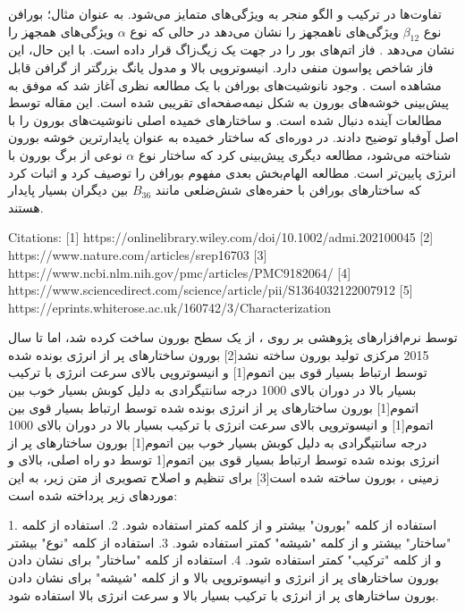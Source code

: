 
تفاوت‌ها در ترکیب و الگو منجر به ویژگی‌های متمایز می‌شود. به عنوان مثال؛ بورافن نوع $\beta_{12}$ ویژگی‌های ناهمجهز را نشان می‌دهد  در حالی که نوع $\alpha$ ویژگی‌های همجهز را نشان می‌دهد . فاز  اتم‌های بور را در جهت یک زیگ‌زاگ قرار داده است. با این حال، این فاز شاخص پواسون منفی دارد. انیسوتروپی بالا و مدول یانگ بزرگتر از گرافن قابل مشاهده است . وجود نانوشیت‌های بورافن با یک مطالعه نظری آغاز شد  که موفق به پیش‌بینی خوشه‌های بورون به شکل نیمه‌صفحه‌ای تقریبی شده است. این مقاله توسط مطالعات آینده دنبال شده است.  و  ساختارهای خمیده اصلی نانوشیت‌های بورون  را با اصل آوفباو توضیح دادند. در دوره‌ای که ساختار خمیده به عنوان پایدارترین خوشه بورون شناخته می‌شود، مطالعه دیگری  پیش‌بینی کرد که ساختار نوع $\alpha$ نوعی از برگ بورون با انرژی پایین‌تر است. مطالعه الهام‌بخش بعدی  مفهوم بورافن را توصیف کرد و اثبات کرد که ساختارهای بورافن با حفره‌های شش‌ضلعی مانند $B_{36}$ بین دیگران بسیار پایدار هستند.
\begin{latin}
    Citations:
[1] https://onlinelibrary.wiley.com/doi/10.1002/admi.202100045
[2] https://www.nature.com/articles/srep16703
[3] https://www.ncbi.nlm.nih.gov/pmc/articles/PMC9182064/
[4] https://www.sciencedirect.com/science/article/pii/S1364032122007912
[5] https://eprints.whiterose.ac.uk/160742/3/Characterization%
\end{latin}
توسط نرم‌افزارهای پژوهشی بر روی ، از یک سطح بورون ساخت کرده شد، اما تا سال 2015 مرکزی تولید بورون ساخته نشد[2] بورون ساختارهای پر از انرژی بونده شده توسط ارتباط بسیار قوی بین اتموم[1] و انیسوتروپی بالای سرعت انرژی با ترکیب بسیار بالا در دوران بالای 1000 درجه سانتیگرادی به دلیل کوبش بسیار خوب بین اتموم[1] بورون ساختارهای پر از انرژی بونده شده توسط ارتباط بسیار قوی بین اتموم[1] و انیسوتروپی بالای سرعت انرژی با ترکیب بسیار بالا در دوران بالای 1000 درجه سانتیگرادی به دلیل کوبش بسیار خوب بین اتموم[1] بورون ساختارهای پر از انرژی بونده شده توسط ارتباط بسیار قوی بین اتموم[1 توسط دو راه اصلی، بالای و زمینی ، بورون ساخته شده است[3] برای تنظیم و اصلاح تصویری از متن زیر، به این موردهای زیر پرداخته شده است:

1. استفاده از کلمه "بورون" بیشتر و از کلمه  کمتر استفاده شود.
2. استفاده از کلمه "ساختار" بیشتر و از کلمه "شیشه" کمتر استفاده شود.
3. استفاده از کلمه "نوع" بیشتر و از کلمه "ترکیب" کمتر استفاده شود.
4. استفاده از کلمه "ساختار" برای نشان دادن بورون ساختارهای پر از انرژی و انیسوتروپی بالا و از کلمه "شیشه" برای نشان دادن بورون ساختارهای پر از انرژی با ترکیب بسیار بالا و سرعت انرژی بالا استفاده شود.

